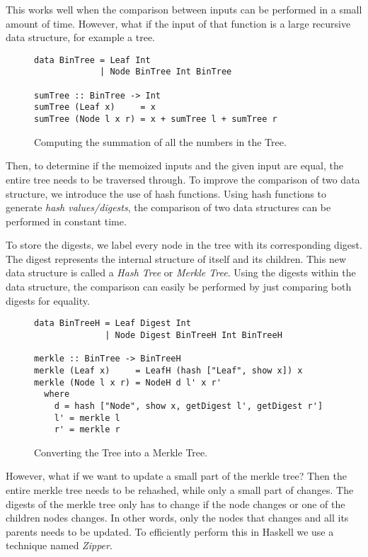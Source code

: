 This works well when the comparison between inputs can be performed in a small amount of time. However, what if the input of that function is a large recursive data structure, for example a tree.  

\begin{figure}[H]
\captionsetup{justification=justified,singlelinecheck=false,margin=0cm}
\begin{verbatim}
data BinTree = Leaf Int
             | Node BinTree Int BinTree

sumTree :: BinTree -> Int
sumTree (Leaf x)     = x
sumTree (Node l x r) = x + sumTree l + sumTree r
\end{verbatim}
\caption{Computing the summation of all the numbers in the Tree.}
\label{fig-bin-tree}
\end{figure}

Then, to determine if the memoized inputs and the given input are equal, the entire tree needs to be traversed through. To improve the comparison of two data structure, we introduce the use of hash functions. Using hash functions to generate \textit{hash values/digests}, the comparison of two data structures can be performed in constant time.

To store the digests, we label every node in the tree with its corresponding digest. The digest represents the internal structure of itself and its children. This new data structure is called a \textit{Hash Tree} or \textit{Merkle Tree}\cite{merkle1987digital}. Using the digests within the data structure, the comparison can easily be performed by just comparing both digests for equality.

\begin{figure}[H]
\captionsetup{justification=justified,singlelinecheck=false,margin=0cm}
\begin{verbatim}
data BinTreeH = Leaf Digest Int
              | Node Digest BinTreeH Int BinTreeH

merkle :: BinTree -> BinTreeH
merkle (Leaf x)     = LeafH (hash ["Leaf", show x]) x
merkle (Node l x r) = NodeH d l' x r'
  where
    d = hash ["Node", show x, getDigest l', getDigest r']
    l' = merkle l
    r' = merkle r
\end{verbatim}
\caption{Converting the Tree into a Merkle Tree.}
\label{fig-conv-tree}
\end{figure}

However, what if we want to update a small part of the merkle tree? Then the entire merkle tree needs to be rehashed, while only a small part of changes. The digests of the merkle tree only has to change if the node changes or one of the children nodes changes. In other words, only the nodes that changes and all its parents needs to be updated. To efficiently perform this in Haskell we use a technique named \textit{Zipper}\cite{huet1997zipper}.  

